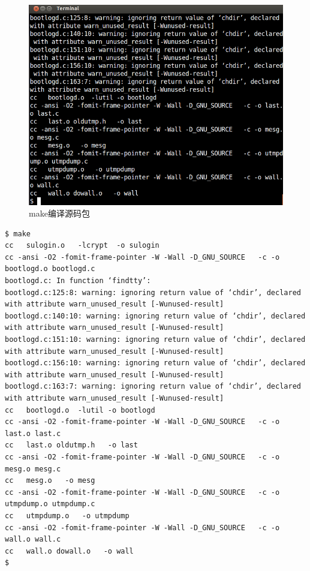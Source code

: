 \begin{figure}[htbp]
\centering
\includegraphics{./pictures/1-4-make.png}
\caption{make编译源码包}
\end{figure}

{\begin{shaded}\begin{verbatim}
$ make
cc   sulogin.o   -lcrypt  -o sulogin
cc -ansi -O2 -fomit-frame-pointer -W -Wall -D_GNU_SOURCE   -c -o bootlogd.o bootlogd.c
bootlogd.c: In function ‘findtty’:
bootlogd.c:125:8: warning: ignoring return value of ‘chdir’, declared with attribute warn_unused_result [-Wunused-result]
bootlogd.c:140:10: warning: ignoring return value of ‘chdir’, declared with attribute warn_unused_result [-Wunused-result]
bootlogd.c:151:10: warning: ignoring return value of ‘chdir’, declared with attribute warn_unused_result [-Wunused-result]
bootlogd.c:156:10: warning: ignoring return value of ‘chdir’, declared with attribute warn_unused_result [-Wunused-result]
bootlogd.c:163:7: warning: ignoring return value of ‘chdir’, declared with attribute warn_unused_result [-Wunused-result]
cc   bootlogd.o  -lutil -o bootlogd
cc -ansi -O2 -fomit-frame-pointer -W -Wall -D_GNU_SOURCE   -c -o last.o last.c
cc   last.o oldutmp.h   -o last
cc -ansi -O2 -fomit-frame-pointer -W -Wall -D_GNU_SOURCE   -c -o mesg.o mesg.c
cc   mesg.o   -o mesg
cc -ansi -O2 -fomit-frame-pointer -W -Wall -D_GNU_SOURCE   -c -o utmpdump.o utmpdump.c
cc   utmpdump.o   -o utmpdump
cc -ansi -O2 -fomit-frame-pointer -W -Wall -D_GNU_SOURCE   -c -o wall.o wall.c
cc   wall.o dowall.o   -o wall
$ 
\end{verbatim}\end{shaded}}

